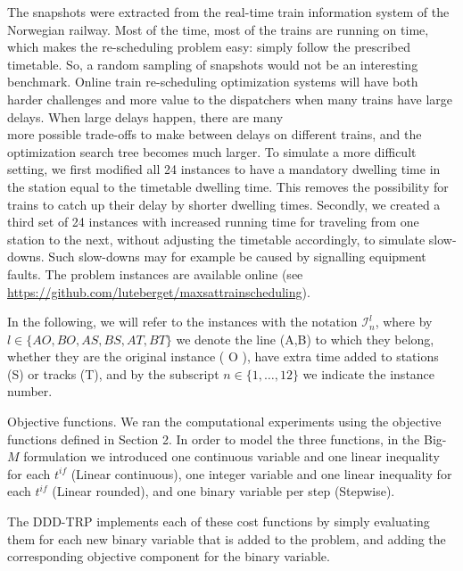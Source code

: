 \documentclass[10pt]{article}
\begin{document}
The snapshots were extracted from the real-time train information system of the Norwegian railway. Most of the time, most of the trains are running on time, which makes the re-scheduling problem easy: simply follow the prescribed timetable. So, a random sampling of snapshots would not be an interesting benchmark. Online train re-scheduling optimization systems will have both harder challenges and more value to the dispatchers when many trains have large delays. When large delays happen, there are many\\
more possible trade-offs to make between delays on different trains, and the optimization search tree becomes much larger. To simulate a more difficult setting, we first modified all 24 instances to have a mandatory dwelling time in the station equal to the timetable dwelling time. This removes the possibility for trains to catch up their delay by shorter dwelling times. Secondly, we created a third set of 24 instances with increased running time for traveling from one station to the next, without adjusting the timetable accordingly, to simulate slow-downs. Such slow-downs may for example be caused by signalling equipment faults. The problem instances are available online (see \href{https://github.com/luteberget/maxsattrainscheduling}{https://github.com/luteberget/maxsattrainscheduling}).

In the following, we will refer to the instances with the notation $\mathcal{I}_{n}^{l}$, where by $l \in\{A O, B O, A S, B S, A T, B T\}$ we denote the line (A,B) to which they belong, whether they are the original instance ( O ), have extra time added to stations (S) or tracks (T), and by the subscript $n \in\{1, \ldots, 12\}$ we indicate the instance number.

Objective functions. We ran the computational experiments using the objective functions defined in Section 2. In order to model the three functions, in the Big- $M$ formulation we introduced one continuous variable and one linear inequality for each $t^{i f}$ (Linear continuous), one integer variable and one linear inequality for each $t^{i f}$ (Linear rounded), and one binary variable per step (Stepwise).

The DDD-TRP implements each of these cost functions by simply evaluating them for each new binary variable that is added to the problem, and adding the corresponding objective component for the binary variable.
\end{document}
